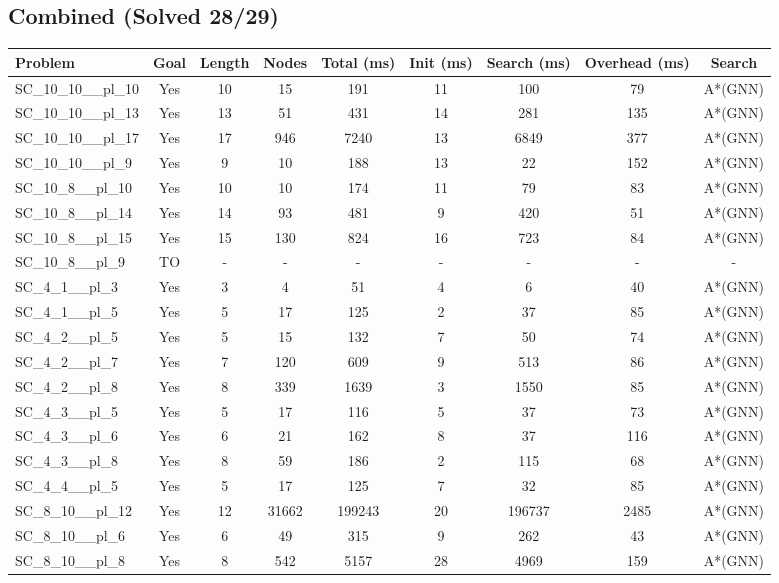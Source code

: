 \documentclass{article}
\begin{document}
\subsection*{Combined (Solved 28/29)}
\begin{tabular}{lcccccccc}
\toprule
Problem & Goal & Length & Nodes & Total (ms) & Init (ms) & Search (ms) & Overhead (ms) & Search \\
\midrule
SC\_10\_10\_\_pl\_10 & Yes & 10 & 15 & 191 & 11 & 100 & 79 & A*(GNN) \\
SC\_10\_10\_\_pl\_13 & Yes & 13 & 51 & 431 & 14 & 281 & 135 & A*(GNN) \\
SC\_10\_10\_\_pl\_17 & Yes & 17 & 946 & 7240 & 13 & 6849 & 377 & A*(GNN) \\
SC\_10\_10\_\_pl\_9 & Yes & 9 & 10 & 188 & 13 & 22 & 152 & A*(GNN) \\
SC\_10\_8\_\_pl\_10 & Yes & 10 & 10 & 174 & 11 & 79 & 83 & A*(GNN) \\
SC\_10\_8\_\_pl\_14 & Yes & 14 & 93 & 481 & 9 & 420 & 51 & A*(GNN) \\
SC\_10\_8\_\_pl\_15 & Yes & 15 & 130 & 824 & 16 & 723 & 84 & A*(GNN) \\
SC\_10\_8\_\_pl\_9 & TO & - & - & - & - & - & - & - \\
SC\_4\_1\_\_pl\_3 & Yes & 3 & 4 & 51 & 4 & 6 & 40 & A*(GNN) \\
SC\_4\_1\_\_pl\_5 & Yes & 5 & 17 & 125 & 2 & 37 & 85 & A*(GNN) \\
SC\_4\_2\_\_pl\_5 & Yes & 5 & 15 & 132 & 7 & 50 & 74 & A*(GNN) \\
SC\_4\_2\_\_pl\_7 & Yes & 7 & 120 & 609 & 9 & 513 & 86 & A*(GNN) \\
SC\_4\_2\_\_pl\_8 & Yes & 8 & 339 & 1639 & 3 & 1550 & 85 & A*(GNN) \\
SC\_4\_3\_\_pl\_5 & Yes & 5 & 17 & 116 & 5 & 37 & 73 & A*(GNN) \\
SC\_4\_3\_\_pl\_6 & Yes & 6 & 21 & 162 & 8 & 37 & 116 & A*(GNN) \\
SC\_4\_3\_\_pl\_8 & Yes & 8 & 59 & 186 & 2 & 115 & 68 & A*(GNN) \\
SC\_4\_4\_\_pl\_5 & Yes & 5 & 17 & 125 & 7 & 32 & 85 & A*(GNN) \\
SC\_8\_10\_\_pl\_12 & Yes & 12 & 31662 & 199243 & 20 & 196737 & 2485 & A*(GNN) \\
SC\_8\_10\_\_pl\_6 & Yes & 6 & 49 & 315 & 9 & 262 & 43 & A*(GNN) \\
SC\_8\_10\_\_pl\_8 & Yes & 8 & 542 & 5157 & 28 & 4969 & 159 & A*(GNN) \\

\end{tabular}
\end{document}
